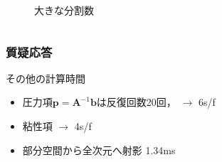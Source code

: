 \documentclass[aspectratio=169,dvipdfmx,hyperref={bookmarks=true}]{beamer}
\begin{document}
\begin{thebibliography}{99}
\begin{frame}
\begin{columns}
\begin{column}{0.33\textwidth}
\begin{figure}
\caption{大きな分割数}
   \end{figure}
    \end{column}
 \end{columns}

\end{frame}
  
 \begin{frame}
 \frametitle{質疑応答}
\begin{block}{その他の計算時間}
\begin{itemize}
	\item 圧力項$\bm{p} = \bm{A}^{-1}\bm{b}$は反復回数20回， $\to$ 6\textmu s/f
	\item 粘性項 $\to$ 4\textmu s/f
	\item 部分空間から全次元へ射影 1.34ms
\end{itemize}
\end{block}
\end{frame}

\end{thebibliography}
\end{document}
